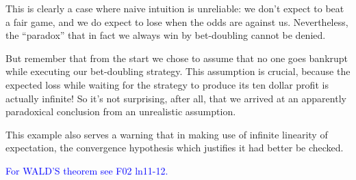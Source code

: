 \begin{editingnotes}
This is clearly a case where naive intuition is unreliable: we don't
expect to beat a fair game, and we do expect to lose when the odds are
against us.  Nevertheless, the ``paradox'' that in fact we always win by
bet-doubling cannot be denied.

But remember that from the start we chose to assume that no one goes
bankrupt while executing our bet-doubling strategy.  This assumption is
crucial, because the expected loss while waiting for the strategy to
produce its ten dollar profit is actually infinite!  So it's not
surprising, after all, that we arrived at an apparently paradoxical
conclusion from an unrealistic assumption.

This example also serves a warning that in making use of infinite
linearity of expectation, the convergence hypothesis which justifies it
had better be checked.

\textcolor{blue}{For WALD'S theorem see F02 ln11-12.}

\end{editingnotes}

\endinput
